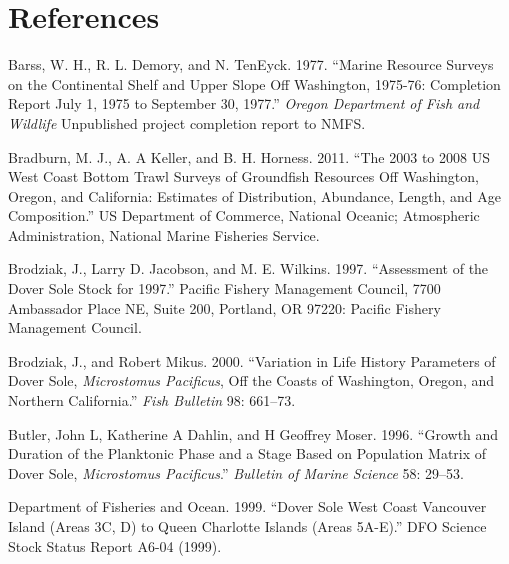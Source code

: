 \documentclass[11pt,
  english,
  a4paper,
]{article}
\begin{document}
\clearpage


\hypertarget{references}{%
\section{References}\label{references}}

\leavevmode\tagmcend\tagstructend


\hypertarget{refs}{}
\begin{cslreferences}
\leavevmode\hypertarget{ref-barss_marine_1977}{}%
Barss, W. H., R. L. Demory, and N. TenEyck. 1977. ``Marine Resource Surveys on the Continental Shelf and Upper Slope Off Washington, 1975-76: Completion Report July 1, 1975 to September 30, 1977.'' \emph{Oregon Department of Fish and Wildlife} Unpublished project completion report to NMFS.

\leavevmode\hypertarget{ref-bradburn_2003_2011}{}%
Bradburn, M. J., A. A Keller, and B. H. Horness. 2011. ``The 2003 to 2008 US West Coast Bottom Trawl Surveys of Groundfish Resources Off Washington, Oregon, and California: Estimates of Distribution, Abundance, Length, and Age Composition.'' US Department of Commerce, National Oceanic; Atmospheric Administration, National Marine Fisheries Service.

\leavevmode\hypertarget{ref-brodziak_assessment_1997}{}%
Brodziak, J., Larry D. Jacobson, and M. E. Wilkins. 1997. ``Assessment of the Dover Sole Stock for 1997.'' Pacific Fishery Management Council, 7700 Ambassador Place NE, Suite 200, Portland, OR 97220: Pacific Fishery Management Council.

\leavevmode\hypertarget{ref-brodziak_variation_2000}{}%
Brodziak, J., and Robert Mikus. 2000. ``Variation in Life History Parameters of Dover Sole, \emph{Microstomus Pacificus}, Off the Coasts of Washington, Oregon, and Northern California.'' \emph{Fish Bulletin} 98: 661--73.

\leavevmode\hypertarget{ref-butler_growth_1996}{}%
Butler, John L, Katherine A Dahlin, and H Geoffrey Moser. 1996. ``Growth and Duration of the Planktonic Phase and a Stage Based on Population Matrix of Dover Sole, \emph{Microstomus Pacificus}.'' \emph{Bulletin of Marine Science} 58: 29--53.

\leavevmode\hypertarget{ref-department_of_fisheries_and_ocean_dover_1999}{}%
Department of Fisheries and Ocean. 1999. ``Dover Sole West Coast Vancouver Island (Areas 3C, D) to Queen Charlotte Islands (Areas 5A-E).'' DFO Science Stock Status Report A6-04 (1999).


\end{cslreferences}
\end{document}
